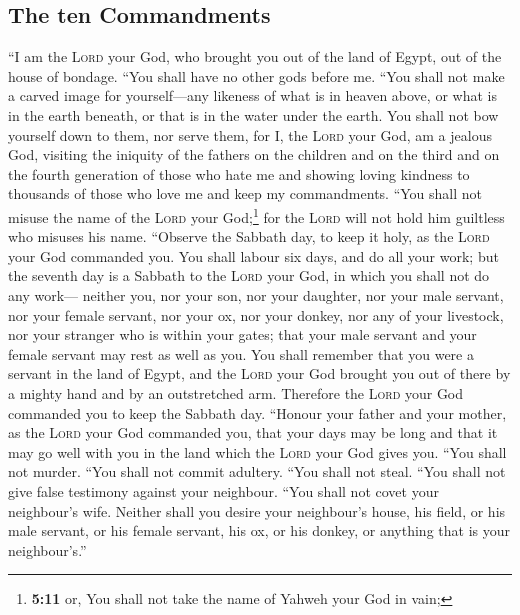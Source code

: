\hypertarget{the-ten-commandments}{%
\subsection{The ten Commandments}\label{the-ten-commandments}}

 ``I am the \textsc{Lord} your God, who brought you out of
the land of Egypt, out of the house of bondage.  ``You
shall have no other gods before me.  ``You shall not make
a carved image for yourself---any likeness of what is in heaven above,
or what is in the earth beneath, or that is in the water under the
earth.  You shall not bow yourself down to them, nor serve
them, for I, the \textsc{Lord} your God, am a jealous God, visiting the
iniquity of the fathers on the children and on the third and on the
fourth generation of those who hate me  and showing
loving kindness to thousands of those who love me and keep my
commandments.  ``You shall not misuse the name of the
\textsc{Lord} your God;\footnote{\textbf{5:11} or, You shall not take
  the name of Yahweh your God in vain;} for the \textsc{Lord} will not
hold him guiltless who misuses his name.  ``Observe the
Sabbath day, to keep it holy, as the \textsc{Lord} your God commanded
you.  You shall labour six days, and do all your work;
 but the seventh day is a Sabbath to the \textsc{Lord}
your God, in which you shall not do any work--- neither you, nor your
son, nor your daughter, nor your male servant, nor your female servant,
nor your ox, nor your donkey, nor any of your livestock, nor your
stranger who is within your gates; that your male servant and your
female servant may rest as well as you.  You shall
remember that you were a servant in the land of Egypt, and the
\textsc{Lord} your God brought you out of there by a mighty hand and by
an outstretched arm. Therefore the \textsc{Lord} your God commanded you
to keep the Sabbath day.  ``Honour your father and your
mother, as the \textsc{Lord} your God commanded you, that your days may
be long and that it may go well with you in the land which the
\textsc{Lord} your God gives you.  ``You shall not
murder.  ``You shall not commit adultery. 
``You shall not steal.  ``You shall not give false
testimony against your neighbour.  ``You shall not covet
your neighbour's wife. Neither shall you desire your neighbour's house,
his field, or his male servant, or his female servant, his ox, or his
donkey, or anything that is your neighbour's.''

